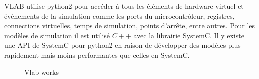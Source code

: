 VLAB utilise python2 pour accéder à tous les éléments de hardware virtuel et évènements de la simulation comme les ports du microcontrôleur, registres, connections virtuelles, temps de simulation, points d'arrête, entre autres. Pour les modèles de simulation il est utilisé $C++$ avec la librairie SystemC\cite{sysc}. Il y existe une API de SystemC pour python2 en raison de développer des modèles plus rapidement mais moins performantes que celles en SystemC. 
\begin{figure}[!htb]
    \centering
    \caption{Vlab works}
    \label{fig:vlab-presentation}
\end{figure}
